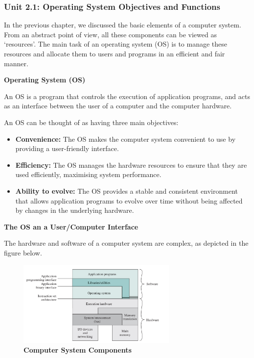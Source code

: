\documentclass{article}
\begin{document}
\subsubsection*{Unit 2.1: Operating System Objectives and Functions}
{}

In the previous chapter, we discussed the basic elements of a computer system.
From an abstract point of view, all these components can be viewed as `resources'.
The main task of an operating system (OS) is to manage these resources and 
allocate them to users and programs in an efficient and fair manner.

\begin{definitionbox}
    \textbf{Operating System (OS)}

    An OS is a program that controls the execution of application programs, 
    and acts as an interface between the user of a computer and the computer hardware.
\end{definitionbox}

An OS can be thought of as having three main objectives:
\begin{itemize}
    \item \textbf{Convenience:} The OS makes the computer system convenient to use by providing a user-friendly interface.
    \item \textbf{Efficiency:} The OS manages the hardware resources to ensure that they are used efficiently, maximising system performance.
    \item \textbf{Ability to evolve:} The OS provides a stable and consistent environment that allows application programs to evolve over time 
    without being affected by changes in the underlying hardware.
\end{itemize}

\textbf{The OS an a User/Computer Interface}

The hardware and software of a computer system are complex, as depicted in the figure below.
\begin{figure}[!h]
    \centering
    \includegraphics[width=0.7\textwidth]{figures/Ch02Figure1.png} %
    \caption{\textbf{Computer System Components}}
    \label{fig:Ch02Fig1}
\end{figure}
\end{document}
